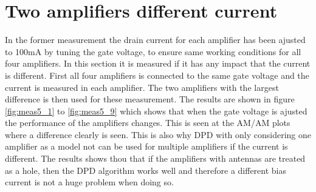 

\section{Two amplifiers different current}
In the former measurement the drain current for each amplifier has been ajusted to 100mA by tuning the gate voltage, to ensure same working conditions for all four amplifiers. In this section it is measured if it has any impact that the current is different. First all four amplifiers is connected to the same gate voltage and the current is measured in each amplifier. The two amplifiers with the largest difference is then used for these measurement. The results are shown in figure \ref{fig:meas5_1} to \ref{fig:meas5_9} which shows that when the gate voltage is ajusted the performance of the amplifiers changes. This is seen at the AM/AM plots where a difference clearly is seen. This is also why DPD with only considering one amplifier as a model not can be used for multiple amplifiers if the current is different. The results shows thou that if the amplifiers with antennas are treated as a hole, then the DPD algorithm works well and therefore a different bias current is not a huge problem when doing so.


